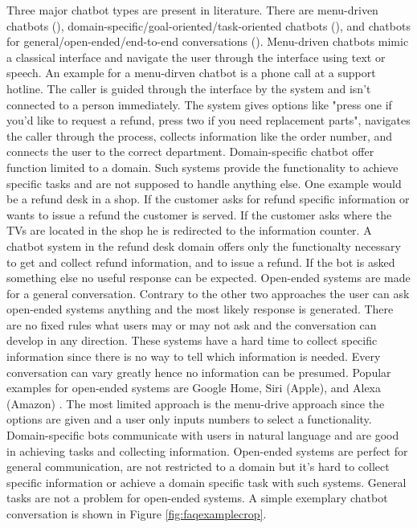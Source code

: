 Three major chatbot types are present in literature.
There are menu-driven chatbots (\citet{singhbuilding}), domain-specific/goal-oriented/task-oriented chatbots (\citet{deshpande2017survey, luis2015williams, braunEvaluatingNLU, williams2017hybrid}),
and chatbots for general/open-ended/end-to-end conversations (\citet{brandtzaeg2018chatbots, singhbuilding}).
Menu-driven chatbots mimic a classical interface and navigate the user through the 
interface using text or speech.
An example for a menu-dirven chatbot is a phone call at a support hotline.
The caller is guided through the interface by the system and isn't connected to a person immediately.
The system gives options like "press one if you'd like to request a refund, press two 
if you need replacement parts", navigates the caller through the process, collects information like the order number, and 
connects the user to the correct department.
Domain-specific chatbot offer function limited to a domain.
Such systems provide the functionality to achieve specific tasks and are not supposed to handle anything else.
One example would be a refund desk in a shop.
If the customer asks for refund specific information or wants to issue a refund the customer is served.
If the customer asks where the TVs are located in the shop he is redirected to the information counter.
A chatbot system in the refund desk domain offers only the functionalty necessary to get and collect refund information, 
and to issue a refund. If the bot is asked something else no useful response can be expected.
Open-ended systems are made for a general conversation.
Contrary to the other two approaches the user can ask open-ended systems anything and the most likely response is generated.
There are no fixed rules what users may or may not ask and the conversation can develop in any direction.
These systems have a hard time to collect specific information since there is no way to tell which information is needed.
Every conversation can vary greatly hence no information can be presumed.
Popular examples for open-ended systems are Google Home, Siri (Apple), and Alexa (Amazon) \cite{singhbuilding}.
The most limited approach is the menu-drive approach since the options are given and a user only inputs numbers to select a functionality.
Domain-specific bots communicate with users in natural language and are good in achieving tasks and collecting information.
Open-ended systems are perfect for general communication, are not restricted to a domain but it's hard to collect specific information
or achieve a domain specific task with such systems. General tasks are not a problem for open-ended systems.
A simple exemplary chatbot conversation is shown in Figure \ref{fig:faqexamplecrop}.

